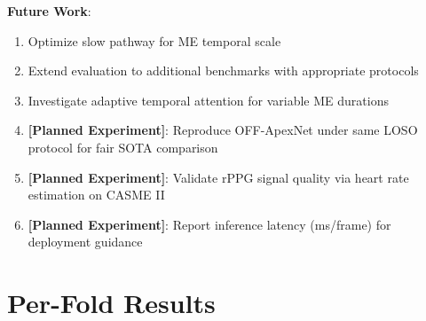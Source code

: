 \documentclass[preprint,12pt,authoryear]{elsarticle}
\begin{document}
\textbf{Future Work}:
\begin{enumerate}
\item Optimize slow pathway for ME temporal scale
\item Extend evaluation to additional benchmarks with appropriate protocols
\item Investigate adaptive temporal attention for variable ME durations
\item \textbf{[Planned Experiment]}: Reproduce OFF-ApexNet under same LOSO protocol for fair SOTA comparison
\item \textbf{[Planned Experiment]}: Validate rPPG signal quality via heart rate estimation on CASME II
\item \textbf{[Planned Experiment]}: Report inference latency (ms/frame) for deployment guidance
\end{enumerate}




\appendix

\section{Per-Fold Results}
\end{document}
